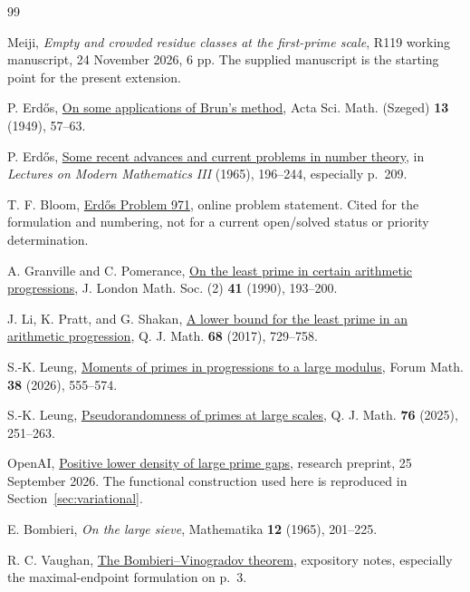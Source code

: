 \documentclass[11pt]{article}
\theoremstyle{remark}
\numberwithin{equation}{section}
\begin{document}
\begin{thebibliography}{99}

Meiji,
\emph{Empty and crowded residue classes at the first-prime scale},
R119 working manuscript, 24 November 2026, 6 pp.
The supplied manuscript is the starting point for the present extension.

P. Erd\H os,
\href{https://www.renyi.hu/~p_erdos/1949-05.pdf}
{On some applications of Brun's method},
Acta Sci. Math. (Szeged) \textbf{13} (1949), 57--63.

P. Erd\H os,
\href{https://www.renyi.hu/~p_erdos/1965-17.pdf}
{Some recent advances and current problems in number theory},
in \emph{Lectures on Modern Mathematics III} (1965), 196--244,
especially p.~209.

T. F. Bloom,
\href{https://www.erdosproblems.com/971}{Erd\H os Problem 971},
online problem statement. Cited for the formulation and numbering,
not for a current open/solved status or priority determination.

A. Granville and C. Pomerance,
\href{https://math.dartmouth.edu/~carlp/least.pdf}
{On the least prime in certain arithmetic progressions},
J. London Math. Soc. (2) \textbf{41} (1990), 193--200.

J. Li, K. Pratt, and G. Shakan,
\href{https://arxiv.org/abs/1607.02543}
{A lower bound for the least prime in an arithmetic progression},
Q. J. Math. \textbf{68} (2017), 729--758.

S.-K. Leung,
\href{https://doi.org/10.1515/forum-2024-0292}
{Moments of primes in progressions to a large modulus},
Forum Math. \textbf{38} (2026), 555--574.

S.-K. Leung,
\href{https://arxiv.org/abs/2407.05380}
{Pseudorandomness of primes at large scales},
Q. J. Math. \textbf{76} (2025), 251--263.

OpenAI,
\href{https://github.com/openai/math/tree/main/preprints/Positive-lower-density-of-large-prime-gaps-September-25-2026}
{Positive lower density of large prime gaps},
research preprint, 25 September 2026.
The functional construction used here is reproduced in
Section~\ref{sec:variational}.

E. Bombieri,
\emph{On the large sieve},
Mathematika \textbf{12} (1965), 201--225.

R. C. Vaughan,
\href{https://personal.science.psu.edu/rcv4/Bombieri.pdf}
{The Bombieri--Vinogradov theorem},
expository notes, especially the maximal-endpoint formulation on p.~3.

\end{thebibliography}
\end{document}
